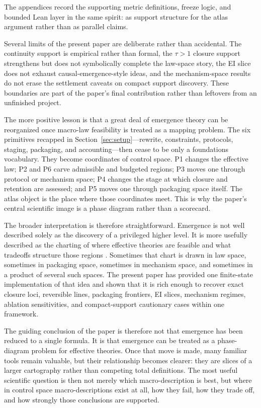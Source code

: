\documentclass[11pt]{article}
\theoremstyle{definition}
\begin{document}
The appendices record the supporting metric definitions, freeze logic, and bounded Lean layer in the same spirit: as support structure for the atlas argument rather than as parallel claims.

Several limits of the present paper are deliberate rather than accidental. The continuity support is empirical rather than formal, the $\tau>1$ closure support strengthens but does not symbolically complete the law-space story, the EI slice does not exhaust causal-emergence-style ideas, and the mechanism-space results do not erase the settlement caveats on compact support discovery. These boundaries are part of the paper's final contribution rather than leftovers from an unfinished project.

The more positive lesson is that a great deal of emergence theory can be reorganized once macro-law feasibility is treated as a mapping problem. The six primitives recapped in Section~\ref{sec:setup}---rewrite, constraints, protocols, staging, packaging, and accounting---then cease to be only a foundations vocabulary. They become coordinates of control space. P1 changes the effective law; P2 and P6 carve admissible and budgeted regions; P3 moves one through protocol or mechanism space; P4 changes the stage at which closure and retention are assessed; and P5 moves one through packaging space itself. The atlas object is the place where those coordinates meet. This is why the paper's central scientific image is a phase diagram rather than a scorecard.

The broader interpretation is therefore straightforward. Emergence is not well described solely as the discovery of a privileged higher level. It is more usefully described as the charting of where effective theories are feasible and what tradeoffs structure those regions \cite{anderson1972more,wilson1975renormalization}. Sometimes that chart is drawn in law space, sometimes in packaging space, sometimes in mechanism space, and sometimes in a product of several such spaces. The present paper has provided one finite-state implementation of that idea and shown that it is rich enough to recover exact closure loci, reversible lines, packaging frontiers, EI slices, mechanism regimes, ablation sensitivities, and compact-support cautionary cases within one framework.

The guiding conclusion of the paper is therefore not that emergence has been reduced to a single formula. It is that emergence can be treated as a phase-diagram problem for effective theories. Once that move is made, many familiar tools remain valuable, but their relationship becomes clearer: they are slices of a larger cartography rather than competing total definitions. The most useful scientific question is then not merely which macro-description is best, but where in control space macro-descriptions exist at all, how they fail, how they trade off, and how strongly those conclusions are supported.
\end{document}
